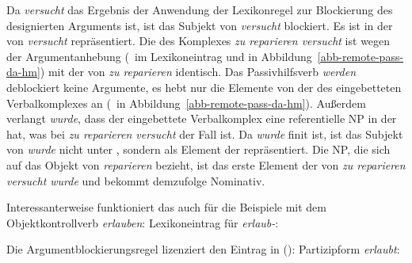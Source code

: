 {Da \emph{versucht} das Ergebnis der Anwendung der Lexikonregel zur Blockierung des designierten Arguments
ist, ist das Subjekt von \emph{versucht} blockiert. 
Es ist in der \daliste von \emph{versucht} repräsentiert. Die \compsl des Komplexes \emph{zu reparieren versucht}
ist wegen der Argumentanhebung (\, im Lexikoneintrag  und 
in Abbildung~\ref{abb-remote-pass-da-hm}) mit der \compsl von \emph{zu reparieren} identisch.
Das Passivhilfsverb \emph{werden} deblockiert keine Argumente, es hebt nur die
Elemente von der \compsl des eingebetteten Verbalkomplexes an (\, in
Abbildung~\ref{abb-remote-pass-da-hm}). Außerdem verlangt \emph{wurde}, dass der eingebettete
Verbalkomplex eine referentielle NP in der \daliste hat, was bei \emph{zu reparieren versucht} der Fall ist.
Da \emph{wurde} finit ist, ist das Subjekt von \emph{wurde} nicht unter \subj, sondern
als Element der \compsl repräsentiert. Die NP, die sich auf das Objekt von
\emph{reparieren} bezieht, ist das erste Element der \compsl von \emph{zu reparieren versucht wurde}
und bekommt demzufolge Nominativ.


Interessanterweise funktioniert das auch für die Beispiele mit dem Objektkontrollverb \emph{erlauben}:\label{page-remote-passive-erlauben}
\eas
Lexikoneintrag für \emph{erlaub-}:\\
\zs

\noindent
Die Argumentblockierungsregel lizenziert den Eintrag in ():
\eas
Partizipform \emph{erlaubt}:\\
\zs

}

